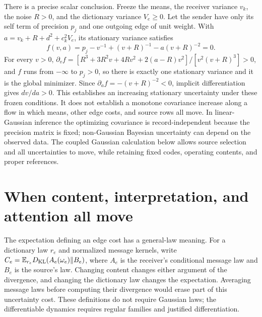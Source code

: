There is a precise scalar conclusion. Freeze the means, the receiver variance $v_k$, the noise $R>0$, and the dictionary variance $V_e\geq0$. Let the sender have only its self term of precision $p_j$ and one outgoing edge of unit weight. With $a=v_k+R+d^2+c_k^2V_e$, its stationary variance satisfies
\begin{equation}
 f(v,a)=p_j-v^{-1}+(v+R)^{-1}
                  -a(v+R)^{-2}=0.
 \label{c18:variance-stationary}
\end{equation}
For every $v>0$, $\partial_vf=[R^3+3R^2v+4Rv^2+2(a-R)v^2]/[v^2(v+R)^3]>0$, and $f$ runs from $-\infty$ to $p_j>0$, so there is exactly one stationary variance and it is the global minimizer. Since $\partial_af=-(v+R)^{-2}<0$, implicit differentiation gives $dv/da>0$. This establishes an increasing stationary uncertainty under these frozen conditions. It does not establish a monotone covariance increase along a flow in which means, other edge costs, and source rows all move. In linear-Gaussian inference the optimizing covariance is record-independent because the precision matrix is fixed; non-Gaussian Bayesian uncertainty can depend on the observed data. The coupled Gaussian calculation below allows source selection and all uncertainties to move, while retaining fixed codes, operating contents, and proper references.

\section{When content, interpretation, and attention all move}
\label{c18:coupled}

The expectation defining an edge cost has a general-law meaning. For a dictionary law $r_e$ and normalized message kernels, write $C_e=\mathbb E_{r_e}D_{\mathrm{KL}}(A_e(\omega_e)\Vert B_e)$, where $A_e$ is the receiver's conditional message law and $B_e$ is the source's law. Changing content changes either argument of the divergence, and changing the dictionary law changes the expectation. Averaging message laws before computing their divergence would erase part of this uncertainty cost. These definitions do not require Gaussian laws; the differentiable dynamics requires regular families and justified differentiation.

